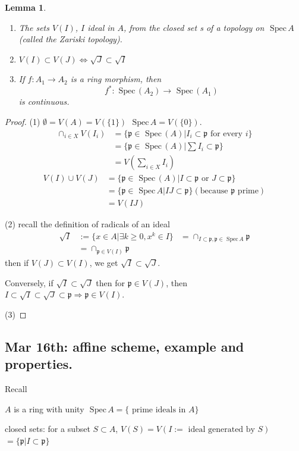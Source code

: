 \documentclass[11pt]{article}
\newtheorem{lemma}[thm]{Lemma}
\newcommand{\spec}{\text{ Spec}\,}
\newcommand{\scp}{{\mathfrak p}}
\newcommand{\Lrta}{\Longrightarrow}
\newcommand{\lrta}{\longrightarrow}
\newcommand{\Llrta}{\Longleftrightarrow}
\begin{document}
\begin{lemma}\ 
\begin{enumerate}[label=(\arabic*)]
\item The sets $V(I)$, $I$ ideal in $A$, from  the closed set s of a topology on $\spec A$ (called the Zariski topology).
\item $V(I)\subset V(J)\Llrta \sqrt{J}\subset \sqrt{I}$
\item If $f: A_1\lrta A_2$ is a ring morphism, then 
$$
f^*:\spec(A_2)\lrta \spec(A_1)
$$
is continuous.
\end{enumerate}
\end{lemma}
\begin{proof}
(1) $\emptyset =V(A)=V(\{1\})$ $\spec A=V(\{0\})$.
$$
\begin{aligned}
\cap_{i\in X}V(I_i)&=\{\scp\in \spec(A)|I_i\subset \scp\text{ for every $i$}\}\\
&=\{\scp\in \spec(A)|\sum I_i\subset \scp\}\\
&= V\left(\sum_{i\in X}I_i\right)
\end{aligned}
$$
$$
\begin{aligned}
V(I)\cup V(J)&=\{\scp\in\spec (A)|I\subset \scp\text{  or } J\subset \scp\}\\
&=\{\scp\in\spec A|I J\subset \scp\}(\text{because $\scp$ prime})\\
&=V(IJ)
\end{aligned}
$$

(2) recall the definition of radicals of an ideal 
$$
\begin{aligned}
\sqrt{I}&:=\{x\in A|\exists k\geq 0, x^k\in I\}
&=\cap_{I\subset \scp,\scp\in\spec A}\scp\\
&=\cap_{\scp \in V(I)}\scp
\end{aligned}
$$
then if $V(J)\subset V(I)$, we get $\sqrt{I}\subset \sqrt{J}$.

Conversely, if $\sqrt{I}\subset \sqrt{J}$ then for $\scp\in V(J)$, then
$I\subset \sqrt{I}\subset\sqrt{J}\subset \scp\Lrta \scp\in V(I)$.

(3)
\end{proof}

\subsection{Mar 16th: affine scheme, example and properties.}
Recall

$A$ is a ring with unity
$\spec A=\{\text{ prime ideals in $A$}\}$

closed sets: for a subset $S\subset A$,
$V(S)=V(I:=\text{ ideal generated by $S$})$ $=\{\scp|I\subset \scp\}$
\end{document}
